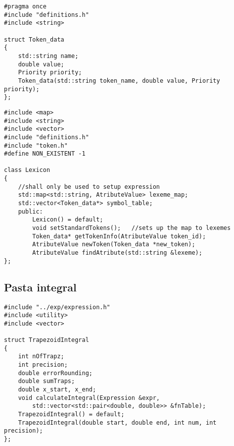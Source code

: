 \documentclass[12pt, letterpaper]{article}
\begin{document}
\begin{spacing}{3.5}
\end{spacing}

\begin{lstlisting}[caption=token.h]
#pragma once
#include "definitions.h"
#include <string>

struct Token_data
{
    std::string name;
    double value;
    Priority priority;
    Token_data(std::string token_name, double value, Priority priority);
};
\end{lstlisting}

\begin{spacing}{3.5}
\end{spacing}

\begin{lstlisting}[caption=lexicon.h]
#include <map>
#include <string>
#include <vector>
#include "definitions.h"
#include "token.h"
#define NON_EXISTENT -1

class Lexicon
{
    //shall only be used to setup expression
    std::map<std::string, AtributeValue> lexeme_map; 
    std::vector<Token_data*> symbol_table;
    public:
        Lexicon() = default;
        void setStandardTokens();   //sets up the map to lexemes
        Token_data* getTokenInfo(AtributeValue token_id); 
        AtributeValue newToken(Token_data *new_token);
        AtributeValue findAtribute(std::string &lexeme);
};
\end{lstlisting}

\newpage
\subsection{Pasta integral}

\begin{spacing}{2.5}
\end{spacing}

\begin{lstlisting}[caption=integral.h]
#include "../exp/expression.h"
#include <utility>
#include <vector>

struct TrapezoidIntegral
{
    int nOfTrapz;
    int precision;
    double errorRounding;
    double sumTraps;
    double x_start, x_end;
    void calculateIntegral(Expression &expr,
        std::vector<std::pair<double, double>> &fnTable);
    TrapezoidIntegral() = default;
    TrapezoidIntegral(double start, double end, int num, int precision);
};
\end{lstlisting}

\begin{spacing}{3.5}
\end{spacing}
\end{document}
